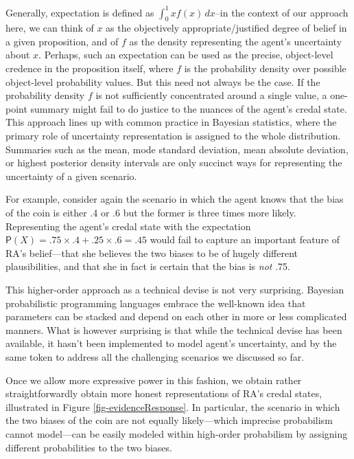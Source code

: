 \documentclass[
  letterpaper,
  DIV=11,
  numbers=noendperiod]{scrartcl}
\begin{document}
Generally, expectation is defined as \(\int_{0}^{1} x f(x) \, dx\)--in
the context of our approach here, we can think of \(x\) as the
objectively appropriate/justified degree of belief in a given
proposition, and of \(f\) as the density representing the agent's
uncertainty about \(x\). Perhaps, such an expectation can be used as the
precise, object-level credence in the proposition itself, where \(f\) is
the probability density over possible object-level probability values.
But this need not always be the case. If the probability density \(f\)
is not sufficiently concentrated around a single value, a one-point
summary might fail to do justice to the nuances of the agent's credal
state. This approach lines up with common practice in Bayesian
statistics, where the primary role of uncertainty representation is
assigned to the whole distribution. Summaries such as the mean, mode
standard deviation, mean absolute deviation, or highest posterior
density intervals are only succinct ways for representing the
uncertainty of a given scenario.

For example, consider again the scenario in which the agent knows that
the bias of the coin is either .4 or .6 but the former is three times
more likely. Representing the agent's credal state with the expectation
\(\mathsf{P}(X) = .75 \times .4 + .25 \times .6 = .45\) would fail to
capture an important feature of RA's belief---that she believes the two
biases to be of hugely different plausibilities, and that she in fact is
certain that the bias is \emph{not} .75.

This higher-order approach as a technical devise is not very surprising.
Bayesian probabilistic programming languages embrace the well-known idea
that parameters can be stacked and depend on each other in more or less
complicated manners. What is however
surprising is that while the technical devise has been available, it
hasn't been implemented to model agent's uncertainty, and by the same
token to address all the challenging scenarios we discussed so far.

Once we allow more expressive power in this fashion, we obtain rather
straightforwardly obtain more honest representations of RA's credal
states, illustrated in Figure \ref{fig-evidenceResponse}. In particular,
the scenario in which the two biases of the coin are not equally
likely---which imprecise probabilism cannot model---can be easily
modeled within high-order probabilism by assigning different
probabilities to the two biases.
\end{document}
